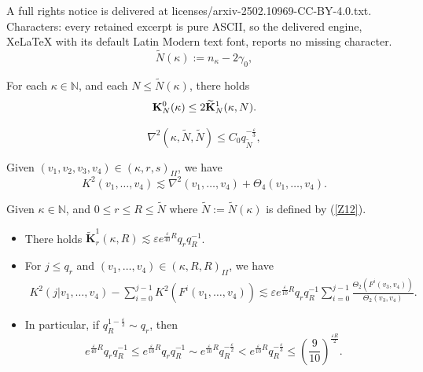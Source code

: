 \documentclass[10pt,a4paper]{amsart}
\begin{document}
A full rights notice is delivered at licenses/arxiv-2502.10969-CC-BY-4.0.txt. Characters: every retained excerpt is pure ASCII, so the delivered engine, XeLaTeX with its default Latin Modern text font, reports no missing character.
\begin{equation}\label{Z12}
\tilde{N}(\kappa):=n_\kappa-2\gamma_0,
\end{equation}

\begin{Proposition}\label{ko11}
For each $\kappa\in \mathbb{N}$, and each $N\leq \tilde{N}(\kappa)$, there holds \[\bold{K}_N^0(\kappa)\leq 2 \widetilde{\mathbf{K}}_N^1(\kappa,N).\]
\end{Proposition}

\begin{equation}\label{f2x}
\nabla^2(\kappa,\tilde{N},\tilde{N})\leq C_0 q_{\tilde{N}}^{-\frac{\varepsilon}{3}},
\end{equation}

\begin{Lemma}\label{K22}
Given $(v_1,v_2,v_3,v_4)\in (\kappa,r,s)_{II}$, we have
\[K^2(v_1,\ldots,v_4)\lesssim \nabla^2(v_1,\ldots,v_4)+\Theta_4(v_1,\ldots,v_4).\]
\end{Lemma}

\begin{Lemma}\label{keyy1}
Given $\kappa\in\mathbb{N}$, and $0\leq r\leq R\leq \tilde{N}$ where  $\tilde{N}:=\tilde{N}(\kappa)$ is defined by (\ref{Z12}).
\begin{itemize}
	\item [(1)] There holds $\widetilde{\mathbf{K}}_r^1(\kappa,R)\lesssim \varepsilon e^{\frac{\varepsilon}{40}R}q_rq_R^{-1}$.
	\item [(2)] For $j\leq q_r$ and $(v_1,\ldots,v_4)\in (\kappa,R,R)_{II}$, we have
	\begin{align*}
		K^2(j|v_1,\ldots,v_4)-\sum_{i=0}^{j-1}K^2(F^i(v_1,\ldots,v_4))
		\lesssim \varepsilon e^{\frac{\varepsilon}{10}R}q_rq_R^{-1}\sum_{i=0}^{j-1}\frac{\Theta_2(F^i(v_3,v_4))}{\Theta_2(v_3,v_4)}.
	\end{align*}
	\item [(3)] In particular, if $q_R^{1-\frac{\varepsilon}{2}}\sim q_r$, then
	\begin{equation}\label{eeps}
	e^{\frac{\varepsilon}{40}R}q_rq_R^{-1}\leq e^{\frac{\varepsilon}{10}R}q_rq_R^{-1}\sim e^{\frac{\varepsilon}{10}R}q_R^{-\frac{\varepsilon}{2}}<e^{\frac{\varepsilon}{10}R}q_R^{-\frac{\varepsilon}{3}}\leq (\frac{9}{10})^{\frac{\varepsilon R}{2}}.
	\end{equation}
\end{itemize}
\end{Lemma}
\end{document}
